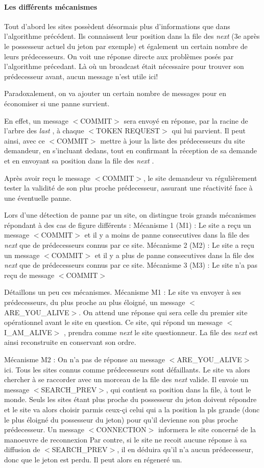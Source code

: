 \documentclass[a4paper,12pt]{article}
\newcommand{\last}{\textit{last} }
\newcommand{\next}{\textit{next} }
\begin{document}
\paragraph{Les différents mécanismes}
Tout d'abord les sites possèdent désormais plus d'informations que dans l'algorithme précédent. Ils connaissent leur position dans la file des \next (3e après le possesseur actuel du jeton par exemple) et également un certain nombre de leurs prédecesseurs. On voit une réponse directe aux problèmes posés par l'algorithme précedant. Là où un broadcast était nécessaire pour trouver son prédecesseur avant, aucun message n'est utile ici! 

Paradoxalement, on va ajouter un certain nombre de messages pour en économiser si une panne survient.

En effet, un message $<$COMMIT$>$ sera envoyé en réponse, par la racine de l'arbre des \last, à chaque $<$TOKEN REQUEST$>$ qui lui parvient. Il peut ainsi, avec ce $<$COMMIT$>$ mettre à jour la liste des prédecesseurs du site demandeur, en s'incluant dedans, tout en confirmant la réception de sa demande et en envoyant sa position dans la file des \next.

Après avoir reçu le message $<$COMMIT$>$, le site demandeur va régulièrement tester la validité de son plus proche prédecesseur, assurant une réactivité face à une éventuelle panne.


Lors d'une détection de panne par un site, on distingue trois grands mécanismes répondant à des cas de figure différents : 
Mécanisme 1 (M1) : Le site a reçu un message $<$COMMIT$>$ et il y a moins de panne consecutives dans la file des \next que de prédecesseurs connus par ce site. 
Mécanisme 2 (M2) : Le site a reçu un message $<$COMMIT$>$ et il y a plus de panne consecutives dans la file des \next que de prédecesseurs connus par ce site.
Mécanisme 3 (M3) : Le site n'a pas reçu de message $<$COMMIT$>$

Détaillons un peu ces mécanismes.
Mécanisme M1 : Le site va envoyer à ses prédecesseurs, du plus proche au plus éloigné, un message $<$ARE\_YOU\_ALIVE$>$. On attend une réponse qui sera celle du premier site opérationnel avant le site en question. Ce site, qui répond un message $<$I\_AM\_ALIVE$>$ , prendra comme \next le site 
questionneur. La file des \next est ainsi reconstruite en conservant son ordre.

Mécanisme M2 : On n'a pas de réponse au message $<$ARE\_YOU\_ALIVE$>$ ici. Tous les sites connus comme prédecesseurs sont défaillants. Le site va alors chercher à se raccorder avec un morceau de la file des \next valide. Il envoie un message $<$SEARCH\_PREV$>$, qui contient sa position dans la file, à tout le monde.
Seuls les sites étant plus proche du possesseur du jeton doivent répondre et le site va alors choisir parmis ceux-çi celui qui a la position la pls grande (donc le plus éloigné du possesseur du jeton) pour qu'il devienne son plus proche prédecesseur. Un message $<$CONNECTION$>$ informera le site concerné de la manoeuvre de reconnexion
Par contre, si le site ne recoit aucune réponse à sa diffusion de $<$SEARCH\_PREV$>$, il en déduira qu'il n'a aucun prédecesseur, donc que le jeton est perdu. Il peut alors en régeneré un.
\end{document}
